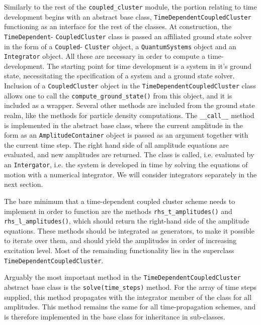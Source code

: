     Similarly to the rest of the \lstinline{coupled_cluster} module, the portion relating
    to time development begins with an abstract base class,
    \lstinline{TimeDependentCoupledCluster}
    functioning as an interface for the rest of the classes. At construction, the 
    \lstinline{TimeDependent}- \lstinline{CoupledCluster} class is passed an affiliated 
    ground state solver in the form of a \lstinline{Coupled}- \lstinline{Cluster} object, a 
    \lstinline{QuantumSystems} object and an \lstinline{Integrator} object. All these 
    are necessary in order to compute a time-development. The starting point for 
    time development is a system in it's ground state, necessitating the specification 
    of a system and a ground state solver.
    Inclusion of a \lstinline{CoupledCluster} object in the 
    \lstinline{TimeDependentCoupledCluster} class allows one to call the 
    \lstinline{compute_ground_state()} from this object, and it is included as a 
    wrapper. Several other methods are included from the ground state realm, like 
    the methods for particle density computations. 
    The \lstinline{__call__} method is implemented in 
    the abstract base class, where the current amplitude in the form as an 
    \lstinline{AmplitudeContainer} object is passed as an argument 
    together with the current time step. The right hand side of all amplitude equations 
    are evaluated, and new amplitudes are returned. The class is called, i.e. evaluated 
    by an \lstinline{Intergator}, i.e. the system is developed in time by solving 
    the equations of motion with a numerical integrator.  We will consider 
    integrators separately in the next section.

    The bare minimum that a time-dependent coupled cluster scheme needs to implement 
    in order to function are the methods \lstinline{rhs_t_amplitudes()} and 
    \lstinline{rhs_l_amplitudes()}, which should return the right-hand side of 
    the amplitude equations. These methods should be integrated as generators, to make 
    it possible to iterate over them, and should yield the amplitudes in order of 
    increasing excitation level. Most of the remainding functionality lies in the 
    superclass \lstinline{TimeDependentCoupledCluster}.

    Arguably the most important method in the \lstinline{TimeDependentCoupledCluster}
    abstract base class is the \lstinline{solve(time_steps)} method. For the array 
    of time steps supplied, this method propagates with the integrator member of the 
    class for all amplitudes. This method remains the same for all time-propagation 
    schemes, and is therefore implemented in the base class for inheritance in 
    sub-classes. 

